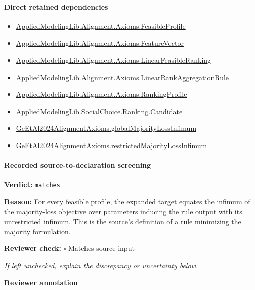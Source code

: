 \documentclass[10pt]{article}
\newcommand{\reviewerbox}{%
  \par\noindent\fbox{\parbox{0.96\linewidth}{\rule{0pt}{0.38in}}}\par
}
\newcommand{\reviewmatch}[1]{%
  \par\noindent\textbf{Reviewer check:} $\square$\; #1\par
  \noindent\emph{If left unchecked, explain the discrepancy or uncertainty below.}\par
}
\begin{document}
\paragraph{Direct retained dependencies}
\begin{itemize}\raggedright
\item \hyperlink{library-prerequisite-5fa7bdb49b050adf}{Applied\allowbreak{}Modeling\allowbreak{}Lib.\allowbreak{}Alignment.\allowbreak{}Axioms.\allowbreak{}Feasible\allowbreak{}Profile}
\item \hyperlink{library-prerequisite-a0b67c6a143b0b13}{Applied\allowbreak{}Modeling\allowbreak{}Lib.\allowbreak{}Alignment.\allowbreak{}Axioms.\allowbreak{}Feature\allowbreak{}Vector}
\item \hyperlink{library-prerequisite-3c30aae25bef2671}{Applied\allowbreak{}Modeling\allowbreak{}Lib.\allowbreak{}Alignment.\allowbreak{}Axioms.\allowbreak{}Linear\allowbreak{}Feasible\allowbreak{}Ranking}
\item \hyperlink{library-prerequisite-43447e121a1884f9}{Applied\allowbreak{}Modeling\allowbreak{}Lib.\allowbreak{}Alignment.\allowbreak{}Axioms.\allowbreak{}Linear\allowbreak{}Rank\allowbreak{}Aggregation\allowbreak{}Rule}
\item \hyperlink{library-prerequisite-9bded048a60dfe0a}{Applied\allowbreak{}Modeling\allowbreak{}Lib.\allowbreak{}Alignment.\allowbreak{}Axioms.\allowbreak{}Ranking\allowbreak{}Profile}
\item \hyperlink{library-prerequisite-8c0e6c25845ae78a}{Applied\allowbreak{}Modeling\allowbreak{}Lib.\allowbreak{}Social\allowbreak{}Choice.\allowbreak{}Ranking.\allowbreak{}Candidate}
\item \hyperlink{paper-prerequisite-e532c12e5479137f}{Ge\allowbreak{}Et\allowbreak{}Al2024\allowbreak{}Alignment\allowbreak{}Axioms.\allowbreak{}global\allowbreak{}Majority\allowbreak{}Loss\allowbreak{}Infimum}
\item \hyperlink{paper-prerequisite-465cdc3ee9c9c6a0}{Ge\allowbreak{}Et\allowbreak{}Al2024\allowbreak{}Alignment\allowbreak{}Axioms.\allowbreak{}restricted\allowbreak{}Majority\allowbreak{}Loss\allowbreak{}Infimum}
\end{itemize}
\paragraph{Recorded source-to-declaration screening}
\textbf{Verdict:} \texttt{matches}
\\
{\raggedright
\textbf{Reason:} For every feasible profile, the expanded target equates the infimum of the majority-\allowbreak{}loss objective over parameters inducing the rule output with its unrestricted infimum.\allowbreak{} This is the source's definition of a rule minimizing the majority formulation.\allowbreak{}
\par}
\reviewmatch{Matches source input}
\noindent\textbf{Reviewer annotation}\par
\reviewerbox
\clearpage
\hypertarget{paper-prerequisite-fa6ae496ed9c0c39}{}
\end{document}
